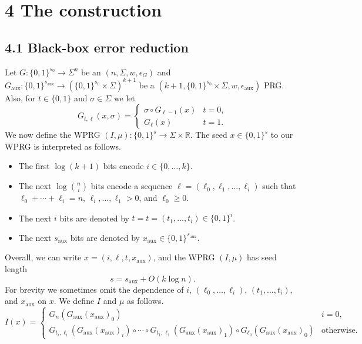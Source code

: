 \section*{4 The construction}
\subsection*{4.1 Black-box error reduction}
Let $G:\{0,1\}^{s_0}\to\Sigma^n$ be an $(n,\Sigma,w,\epsilon_G)$ and $G_{\mathrm{aux}}:\{0,1\}^{s_{\mathrm{aux}}}\to(\{0,1\}^{s_0}\times\Sigma)^{k+1}$ be a $(k+1,\{0,1\}^{s_0}\times\Sigma,w,\epsilon_{\mathrm{aux}})$ PRG. Also, for $t\in\{0,1\}$ and $\sigma\in\Sigma$ we let
\begin{equation}\tag{9}G_{t,\ell}(x,\sigma)=\begin{cases}\sigma\circ G_{\ell-1}(x)&t=0,\\G_\ell(x)&t=1.\end{cases}\end{equation}
We now define the WPRG $(I,\mu):\{0,1\}^s\to\Sigma\times\mathbb R$. The seed $x\in\{0,1\}^s$ to our WPRG is interpreted as follows.
\begin{itemize}
\item The first $\log(k+1)$ bits encode $i\in\{0,\ldots,k\}$.
\item The next $\log\binom ni$ bits encode a sequence $\ell=(\ell_0,\ell_1,\ldots,\ell_i)$ such that $\ell_0+\cdots+\ell_i=n$, $\ell_i,\ldots,\ell_1>0$, and $\ell_0\ge0$.
\item The next $i$ bits are denoted by $t=t=(t_1,\ldots,t_i)\in\{0,1\}^i$.
\item The next $s_{\mathrm{aux}}$ bits are denoted by $x_{\mathrm{aux}}\in\{0,1\}^{s_{\mathrm{aux}}}$.
\end{itemize}
Overall, we can write $x=(i,\ell,t,x_{\mathrm{aux}})$, and the WPRG $(I,\mu)$ has seed length
\begin{equation}\tag{10}s=s_{\mathrm{aux}}+O(k\log n).\end{equation}
For brevity we sometimes omit the dependence of $i$, $(\ell_0,\ldots,\ell_i)$, $(t_1,\ldots,t_i)$, and $x_{\mathrm{aux}}$ on $x$. We define $I$ and $\mu$ as follows.
\[I(x)=\begin{cases}G_n(G_{\mathrm{aux}}(x_{\mathrm{aux}})_0)&i=0,\\G_{t_i,\ell_i}(G_{\mathrm{aux}}(x_{\mathrm{aux}})_i)\circ\cdots\circ G_{t_1,\ell_1}(G_{\mathrm{aux}}(x_{\mathrm{aux}})_1)\circ G_{\ell_0}(G_{\mathrm{aux}}(x_{\mathrm{aux}})_0)&\text{otherwise.}\end{cases}\]
